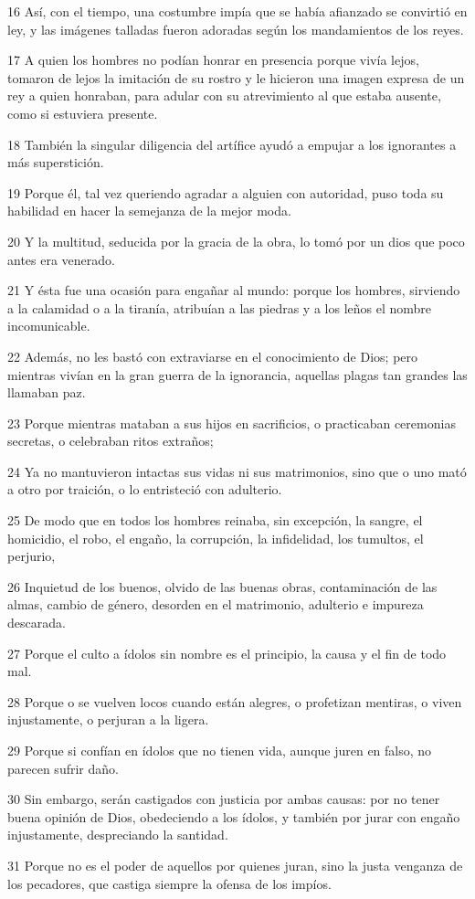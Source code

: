 \par 16 Así, con el tiempo, una costumbre impía que se había afianzado se convirtió en ley, y las imágenes talladas fueron adoradas según los mandamientos de los reyes.
\par 17 A quien los hombres no podían honrar en presencia porque vivía lejos, tomaron de lejos la imitación de su rostro y le hicieron una imagen expresa de un rey a quien honraban, para adular con su atrevimiento al que estaba ausente, como si estuviera presente.
\par 18 También la singular diligencia del artífice ayudó a empujar a los ignorantes a más superstición.
\par 19 Porque él, tal vez queriendo agradar a alguien con autoridad, puso toda su habilidad en hacer la semejanza de la mejor moda.
\par 20 Y la multitud, seducida por la gracia de la obra, lo tomó por un dios que poco antes era venerado.
\par 21 Y ésta fue una ocasión para engañar al mundo: porque los hombres, sirviendo a la calamidad o a la tiranía, atribuían a las piedras y a los leños el nombre incomunicable.
\par 22 Además, no les bastó con extraviarse en el conocimiento de Dios; pero mientras vivían en la gran guerra de la ignorancia, aquellas plagas tan grandes las llamaban paz.
\par 23 Porque mientras mataban a sus hijos en sacrificios, o practicaban ceremonias secretas, o celebraban ritos extraños;
\par 24 Ya no mantuvieron intactas sus vidas ni sus matrimonios, sino que o uno mató a otro por traición, o lo entristeció con adulterio.
\par 25 De modo que en todos los hombres reinaba, sin excepción, la sangre, el homicidio, el robo, el engaño, la corrupción, la infidelidad, los tumultos, el perjurio,
\par 26 Inquietud de los buenos, olvido de las buenas obras, contaminación de las almas, cambio de género, desorden en el matrimonio, adulterio e impureza descarada.
\par 27 Porque el culto a ídolos sin nombre es el principio, la causa y el fin de todo mal.
\par 28 Porque o se vuelven locos cuando están alegres, o profetizan mentiras, o viven injustamente, o perjuran a la ligera.
\par 29 Porque si confían en ídolos que no tienen vida, aunque juren en falso, no parecen sufrir daño.
\par 30 Sin embargo, serán castigados con justicia por ambas causas: por no tener buena opinión de Dios, obedeciendo a los ídolos, y también por jurar con engaño injustamente, despreciando la santidad.
\par 31 Porque no es el poder de aquellos por quienes juran, sino la justa venganza de los pecadores, que castiga siempre la ofensa de los impíos.

